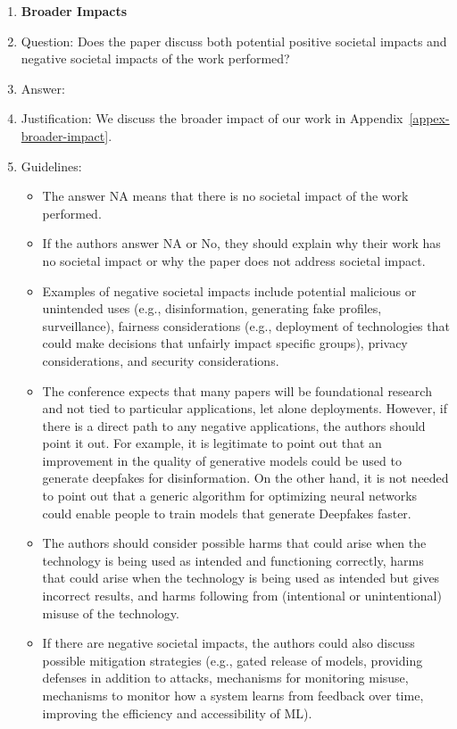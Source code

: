 \documentclass{article}
\theoremstyle{plain}
\theoremstyle{definition}
\theoremstyle{remark}
\begin{document}
\begin{enumerate}
\item {\bf Broader Impacts}
    \item[] Question: Does the paper discuss both potential positive societal impacts and negative societal impacts of the work performed?
    \item[] Answer: \answerYes{} %
    \item[] Justification: We discuss the broader impact of our work in Appendix~\ref{appex-broader-impact}.
    \item[] Guidelines:
    \begin{itemize}
        \item The answer NA means that there is no societal impact of the work performed.
        \item If the authors answer NA or No, they should explain why their work has no societal impact or why the paper does not address societal impact.
        \item Examples of negative societal impacts include potential malicious or unintended uses (e.g., disinformation, generating fake profiles, surveillance), fairness considerations (e.g., deployment of technologies that could make decisions that unfairly impact specific groups), privacy considerations, and security considerations.
        \item The conference expects that many papers will be foundational research and not tied to particular applications, let alone deployments. However, if there is a direct path to any negative applications, the authors should point it out. For example, it is legitimate to point out that an improvement in the quality of generative models could be used to generate deepfakes for disinformation. On the other hand, it is not needed to point out that a generic algorithm for optimizing neural networks could enable people to train models that generate Deepfakes faster.
        \item The authors should consider possible harms that could arise when the technology is being used as intended and functioning correctly, harms that could arise when the technology is being used as intended but gives incorrect results, and harms following from (intentional or unintentional) misuse of the technology.
        \item If there are negative societal impacts, the authors could also discuss possible mitigation strategies (e.g., gated release of models, providing defenses in addition to attacks, mechanisms for monitoring misuse, mechanisms to monitor how a system learns from feedback over time, improving the efficiency and accessibility of ML).
    \end{itemize}
    

\end{enumerate}
\end{document}
